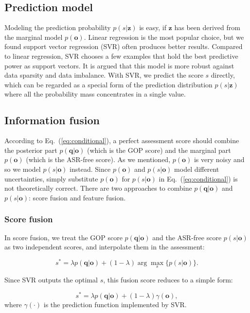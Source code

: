 \documentclass[a4paper]{article}
\begin{document}
\subsection{Prediction model}

Modeling the prediction probability $p(s|\mathbf{z})$ is easy, if $\mathbf{z}$ has been derived from the marginal model $p(\mathbf{o})$.
Linear regression is the most popular choice, but we found support vector regression (SVR) often produces better results.
Compared to linear regression, SVR chooses a few examples that hold the best predictive
power as support vectors. It is argued that this model is more robust against data sparsity and data imbalance. With SVR, we predict the
score $s$ directly, which can be regarded as a special form of the prediction distribution $p(s|\mathbf{z})$
where all the probability mass concentrates in a single value.


\subsection{Information fusion}

According to Eq.~(\ref{eq:conditional}), a perfect assessment score should combine the posterior part $p(\mathbf{q}|\mathbf{o})$ (which is the GOP score)
and the marginal part $p(\mathbf{o})$ (which is the ASR-free score).
As we mentioned, $p(\mathbf{o})$ is very noisy and so we model $p(s|\mathbf{o})$ instead.
Since $p(\mathbf{o})$ and $p(s|\mathbf{o})$ model different uncertainties,
simply substitute $p(\mathbf{o})$ for $p(s|\mathbf{o})$ in Eq.~(\ref{eq:conditional}) is not theoretically correct.
There are two approaches to combine $p(\mathbf{q}|\mathbf{o})$ and $p(s|\mathbf{o})$: score fusion and feature fusion.

\subsubsection{Score fusion}

In score fusion, we treat the GOP score $p(\mathbf{q}|\mathbf{o})$ and the ASR-free score $p(s|\mathbf{o})$ as two independent scores,
and interpolate them in the assessment:

\[
s^* =  \lambda p(\mathbf{q}|\mathbf{o}) + (1-\lambda) \arg\max_{s} \{p(s|\mathbf{o})\}.
\]

\noindent Since SVR outputs the optimal $s$, this fusion score reduces to a simple form:

\[
s^* = \lambda p(\mathbf{q}|\mathbf{o}) + (1-\lambda) \gamma(\mathbf{o}),
\]
\noindent where $\gamma(\cdot)$ is the prediction function implemented by SVR.
\end{document}
